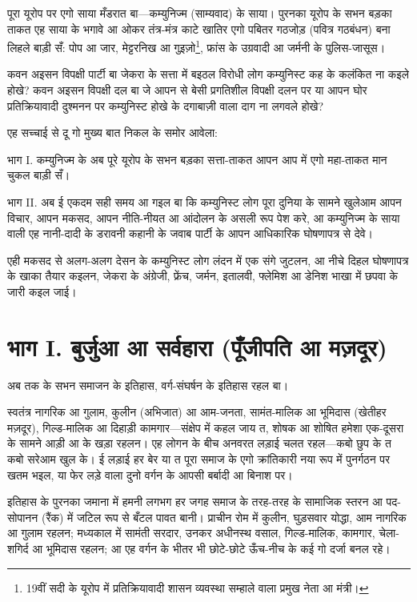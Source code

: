 \documentclass[12pt,a4paper,oneside]{book}
\begin{document}
पूरा यूरोप पर एगो साया मँडरात बा—कम्युनिज्म (साम्यवाद) के साया। पुरनका यूरोप के सभन बड़का ताकत एह साया के भगावे आ ओकर तंत्र-मंत्र काटे खातिर एगो पबितर गठजोड़ (पवित्र गठबंधन) बना लिहले बाड़ी सँ: पोप आ जार, मेट्टरनिख आ गुइज़ो\footnote{19वीं सदी के यूरोप में प्रतिक्रियावादी शासन व्यवस्था सम्हाले वाला प्रमुख नेता आ मंत्री।}, फ्रांस के उग्रवादी आ जर्मनी के पुलिस-जासूस।

कवन अइसन विपक्षी पार्टी बा जेकरा के सत्ता में बइठल विरोधी लोग कम्युनिस्ट कह के कलंकित ना कइले होखे? कवन अइसन विपक्षी दल बा जे आपन से बेसी प्रगतिशील विपक्षी दलन पर या आपन घोर प्रतिक्रियावादी दुश्मनन पर कम्युनिस्ट होखे के दगाबाज़ी वाला दाग ना लगवले होखे?

एह सच्चाई से दू गो मुख्य बात निकल के समोर आवेला:

भाग {\engfont I}. कम्युनिज्म के अब पूरे यूरोप के सभन बड़का सत्ता-ताकत आपन आप में एगो महा-ताकत मान चुकल बाड़ी सँ।

भाग {\engfont II}. अब ई एकदम सही समय आ गइल बा कि कम्युनिस्ट लोग पूरा दुनिया के सामने खुलेआम आपन विचार, आपन मकसद, आपन नीति-नीयत आ आंदोलन के असली रूप पेश करे, आ कम्युनिज्म के साया वाली एह नानी-दादी के डरावनी कहानी के जवाब पार्टी के आपन आधिकारिक घोषणापत्र से देवे।

एही मकसद से अलग-अलग देसन के कम्युनिस्ट लोग लंदन में एक संगे जुटलन, आ नीचे दिहल घोषणापत्र के खाका तैयार कइलन, जेकरा के अंग्रेजी, फ्रेंच, जर्मन, इतालवी, फ्लेमिश आ डेनिश भाखा में छपवा के जारी कइल जाई।

\cleardoublepage
\chapter*{भाग {\engfont I}. बुर्जुआ आ सर्वहारा (पूँजीपति आ मज़दूर)}
अब तक के सभन समाजन के इतिहास, वर्ग-संघर्षन के इतिहास रहल बा।

स्वतंत्र नागरिक आ गुलाम, कुलीन (अभिजात) आ आम-जनता, सामंत-मालिक आ भूमिदास (खेतीहर मज़दूर), गिल्ड-मालिक आ दिहाड़ी कामगार—संक्षेप में कहल जाय त, शोषक आ शोषित हमेशा एक-दूसरा के सामने आड़ी आ के खड़ा रहलन। एह लोगन के बीच अनवरत लड़ाई चलत रहल—कबो छुप के त कबो सरेआम खुल के। ई लड़ाई हर बेर या त पूरा समाज के एगो क्रांतिकारी नया रूप में पुनर्गठन पर खतम भइल, या फेर लड़े वाला दुनो वर्गन के आपसी बर्बादी आ बिनाश पर।

इतिहास के पुरनका जमाना में हमनी लगभग हर जगह समाज के तरह-तरह के सामाजिक स्तरन आ पद-सोपानन (रैंक) में जटिल रूप से बँटल पावत बानी। प्राचीन रोम में कुलीन, घुड़सवार योद्धा, आम नागरिक आ गुलाम रहलन; मध्यकाल में सामंती सरदार, उनकर अधीनस्थ वसाल, गिल्ड-मालिक, कामगार, चेला-शगिर्द आ भूमिदास रहलन; आ एह वर्गन के भीतर भी छोटे-छोटे ऊँच-नीच के कई गो दर्जा बनल रहे।
\end{document}
